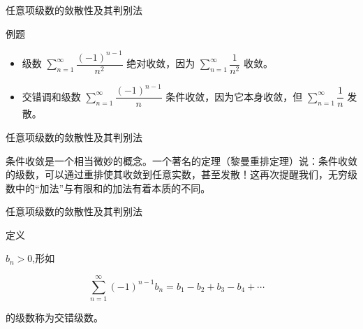 \documentclass[aspectratio=169,10pt,fontset=fandol]{ctexbeamer}
\begin{document}
\begin{frame}[t,fragile]{任意项级数的敛散性及其判别法}
\normalsize
\begin{block}{例题}
{\normalsize
\begin{itemize}

		\item 级数 \(\sum\limits_{n = 1}^{  \infty } \dfrac{(-1)^{n-1}}{n^2}\) 绝对收敛，因为 \(\sum\limits_{n = 1}^{  \infty } \dfrac{1}{n^2}\) 收敛。

		\item 交错调和级数 \(\sum\limits_{n = 1}^{  \infty } \dfrac{(-1)^{n-1}}{n}\) 条件收敛，因为它本身收敛，但 \(\sum\limits_{n = 1}^{  \infty } \dfrac{1}{n}\) 发散。

	\end{itemize}


}
\end{block}
\end{frame}
\begin{frame}[t,fragile]{任意项级数的敛散性及其判别法}
\normalsize
{\normalsize
条件收敛是一个相当微妙的概念。一个著名的定理（黎曼重排定理）说：条件收敛的级数，可以通过重排使其收敛到任意实数，甚至发散！这再次提醒我们，无穷级数中的“加法”与有限和的加法有着本质的不同。


}
\end{frame}
\begin{frame}[t,fragile]{任意项级数的敛散性及其判别法}
\normalsize
\begin{block}{定义}
{\normalsize


$b_n > 0$,形如

\[

\sum_{n=1}^{\infty} (-1)^{n-1} b_n = b_1 - b_2 + b_3 - b_4 + \cdots \quad 

\]

的级数称为交错级数。


}
\end{block}
\end{frame}
\end{document}

